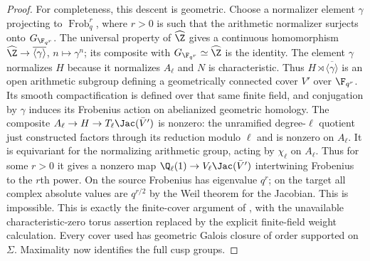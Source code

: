 \begin{proof}
For completeness, this descent is geometric. Choose a normalizer element
$\gamma$ projecting to $\operatorname{Frob}_q^r$, where $r>0$ is such that
the arithmetic normalizer surjects onto $G_{\F_{q^r}}$. The universal
property of $\widehat\Z$ gives a continuous homomorphism
$\widehat\Z\to\overline{\langle\gamma\rangle}$, $n\mapsto\gamma^n$;
its composite with $G_{\F_{q^r}}\simeq\widehat\Z$ is the identity.
The element $\gamma$ normalizes $H$ because it normalizes $A_\ell$ and
$N$ is characteristic. Thus $H\rtimes\overline{\langle\gamma\rangle}$
is an open arithmetic subgroup defining a geometrically connected cover
$V'$ over $\F_{q^r}$. Its smooth compactification is defined over that
same finite field, and conjugation by $\gamma$ induces its Frobenius action
on abelianized geometric homology. The composite
$A_\ell\to H\to T_\ell\Jac(\bar V')$ is nonzero: the unramified
degree-$\ell$ quotient just constructed factors through its reduction
modulo $\ell$ and is nonzero on $A_\ell$. It is equivariant for the
normalizing arithmetic group, acting by $\chi_\ell$ on $A_\ell$.
Thus for some $r>0$ it gives a nonzero map
$\Q_\ell(1)\to V_\ell\Jac(\bar V')$ intertwining Frobenius to the
$r$th power. On the source Frobenius has eigenvalue $q^r$; on the target
all complex absolute values are $q^{r/2}$ by the Weil theorem for the
Jacobian. This is impossible. This is exactly the finite-cover argument
of \citet[Theorem 20, proof]{CF_Stix2008}, with the unavailable characteristic-zero
torus assertion replaced by the explicit finite-field weight calculation.
Every cover used has geometric Galois closure of order supported on
$\Sigma$. Maximality now identifies the full cusp groups.
\end{proof}


